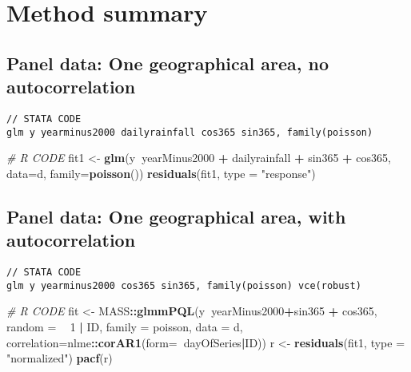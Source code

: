 \documentclass[]{book}
\newenvironment{Shaded}{\begin{snugshade}}{\end{snugshade}}
\newcommand{\KeywordTok}[1]{\textcolor[rgb]{0.13,0.29,0.53}{\textbf{#1}}}
\newcommand{\DataTypeTok}[1]{\textcolor[rgb]{0.13,0.29,0.53}{#1}}
\newcommand{\DecValTok}[1]{\textcolor[rgb]{0.00,0.00,0.81}{#1}}
\newcommand{\StringTok}[1]{\textcolor[rgb]{0.31,0.60,0.02}{#1}}
\newcommand{\CommentTok}[1]{\textcolor[rgb]{0.56,0.35,0.01}{\textit{#1}}}
\newcommand{\OperatorTok}[1]{\textcolor[rgb]{0.81,0.36,0.00}{\textbf{#1}}}
\newcommand{\NormalTok}[1]{#1}
\begin{document}
\section{Method summary}\label{method-summary}

\subsection{Panel data: One geographical area, no
autocorrelation}\label{panel-data-one-geographical-area-no-autocorrelation}

\begin{verbatim}
// STATA CODE
glm y yearminus2000 dailyrainfall cos365 sin365, family(poisson)
\end{verbatim}

\begin{Shaded}
\begin{Highlighting}[]
\CommentTok{# R CODE}
\NormalTok{fit1 <-}\StringTok{ }\KeywordTok{glm}\NormalTok{(y}\OperatorTok{~}\NormalTok{yearMinus2000 }\OperatorTok{+}\StringTok{ }\NormalTok{dailyrainfall }\OperatorTok{+}\StringTok{ }\NormalTok{sin365 }\OperatorTok{+}\StringTok{ }\NormalTok{cos365, }\DataTypeTok{data=}\NormalTok{d, }\DataTypeTok{family=}\KeywordTok{poisson}\NormalTok{())}
\KeywordTok{residuals}\NormalTok{(fit1, }\DataTypeTok{type =} \StringTok{"response"}\NormalTok{)}
\end{Highlighting}
\end{Shaded}

\subsection{Panel data: One geographical area, with
autocorrelation}\label{panel-data-one-geographical-area-with-autocorrelation}

\begin{verbatim}
// STATA CODE
glm y yearminus2000 cos365 sin365, family(poisson) vce(robust)
\end{verbatim}

\begin{Shaded}
\begin{Highlighting}[]
\CommentTok{# R CODE}
\NormalTok{fit <-}\StringTok{ }\NormalTok{MASS}\OperatorTok{::}\KeywordTok{glmmPQL}\NormalTok{(y}\OperatorTok{~}\NormalTok{yearMinus2000}\OperatorTok{+}\NormalTok{sin365 }\OperatorTok{+}\StringTok{ }\NormalTok{cos365, }\DataTypeTok{random =} \OperatorTok{~}\StringTok{ }\DecValTok{1} \OperatorTok{|}\StringTok{ }\NormalTok{ID,}
                \DataTypeTok{family =}\NormalTok{ poisson, }\DataTypeTok{data =}\NormalTok{ d,}
                \DataTypeTok{correlation=}\NormalTok{nlme}\OperatorTok{::}\KeywordTok{corAR1}\NormalTok{(}\DataTypeTok{form=}\OperatorTok{~}\NormalTok{dayOfSeries}\OperatorTok{|}\NormalTok{ID))}
\NormalTok{r <-}\StringTok{ }\KeywordTok{residuals}\NormalTok{(fit1, }\DataTypeTok{type =} \StringTok{"normalized"}\NormalTok{)}
\KeywordTok{pacf}\NormalTok{(r)}
\end{Highlighting}
\end{Shaded}
\end{document}
